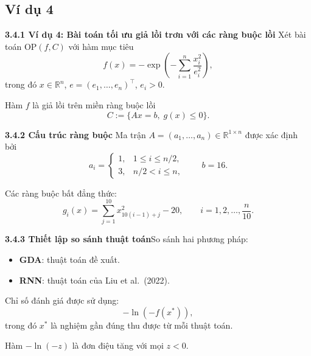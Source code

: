 \subsection{Ví dụ 4}


\begin{frame}{\textbf{\large 3.4.1 Ví dụ 4: Bài toán tối ưu giả lồi trơn với các ràng buộc lồi}}
\vspace*{-1cm}
Xét bài toán $\mathrm{OP}(f,C)$ với hàm mục tiêu
\[
f(x) = -\exp\!\left(-\sum_{i=1}^n \frac{x_i^2}{e_i^2}\right),
\]
trong đó $x\in\mathbb{R}^n$, $e=(e_1,\ldots,e_n)^\top$, $e_i>0$.

Hàm $f$ là giả lồi trên miền ràng buộc lồi
\[
C := \{ Ax=b,\; g(x)\le0 \}.
\]
\end{frame}

\begin{frame}{\textbf{\large 3.4.2 Cấu trúc ràng buộc}}
\vspace*{-1cm}
Ma trận $A=(a_1,\ldots,a_n)\in\mathbb{R}^{1\times n}$ được xác định bởi
\[
a_i=
\begin{cases}
1, & 1\le i\le n/2,\\
3, & n/2 < i \le n,
\end{cases}
\qquad
b=16.
\]

Các ràng buộc bất đẳng thức:
\[
g_i(x)=\sum_{j=1}^{10} x_{10(i-1)+j}^2 - 20,
\qquad i=1,2,\ldots,\frac{n}{10}.
\]
\end{frame}

\begin{frame}{\textbf{\large 3.4.3 Thiết lập so sánh thuật toán}}\vspace*{-1cm}So sánh hai phương pháp:
\begin{itemize}
\item \textbf{GDA}: thuật toán đề xuất.
\item \textbf{RNN}: thuật toán của Liu et al.\ (2022).
\end{itemize}

Chỉ số đánh giá được sử dụng:
\[
-\ln(-f(x^*)),
\]
trong đó $x^*$ là nghiệm gần đúng thu được từ mỗi thuật toán.

Hàm $-\ln(-z)$ là đơn điệu tăng với mọi $z<0$.
\end{frame}

